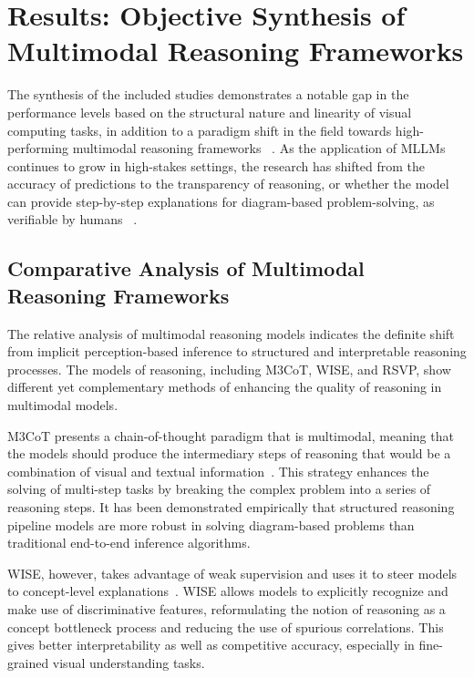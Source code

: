 \documentclass[sigconf, nonacm]{acmart}
\begin{document}
\section{Results: Objective Synthesis of Multimodal Reasoning Frameworks}
The synthesis of the included studies demonstrates a notable gap in the 
performance levels based on the structural nature and linearity of visual 
computing tasks, in addition to a paradigm shift in the field towards 
high-performing multimodal reasoning frameworks~%
\cite{singh2024flowvqa, gutierrez2024seeing, chen2024m3cot}. 
As the application of MLLMs continues to grow in high-stakes settings, 
the research has shifted from the accuracy of predictions to the transparency 
of reasoning, or whether the model can provide step-by-step explanations 
for diagram-based problem-solving, as verifiable by humans~%
\cite{chen2024m3cot, wang2026bridging, jiang2025wise}.

\subsection{Comparative Analysis of Multimodal Reasoning Frameworks}
The relative analysis of multimodal reasoning models indicates the definite 
shift from implicit perception-based inference to structured and interpretable 
reasoning processes. The models of reasoning, including M3CoT, WISE, and RSVP, 
show different yet complementary methods of enhancing the quality of reasoning 
in multimodal models.

M3CoT presents a chain-of-thought paradigm that is multimodal, meaning that 
the models should produce the intermediary steps of reasoning that would be a 
combination of visual and textual information~\cite{chen2024m3cot}. This 
strategy enhances the solving of multi-step tasks by breaking the complex 
problem into a series of reasoning steps. It has been demonstrated empirically 
that structured reasoning pipeline models are more robust in solving 
diagram-based problems than traditional end-to-end inference algorithms.

WISE, however, takes advantage of weak supervision and uses it to steer models 
to concept-level explanations~\cite{jiang2025wise}. WISE allows models to 
explicitly recognize and make use of discriminative features, reformulating 
the notion of reasoning as a concept bottleneck process and reducing the use 
of spurious correlations. This gives better interpretability as well as 
competitive accuracy, especially in fine-grained visual understanding tasks.
\end{document}
